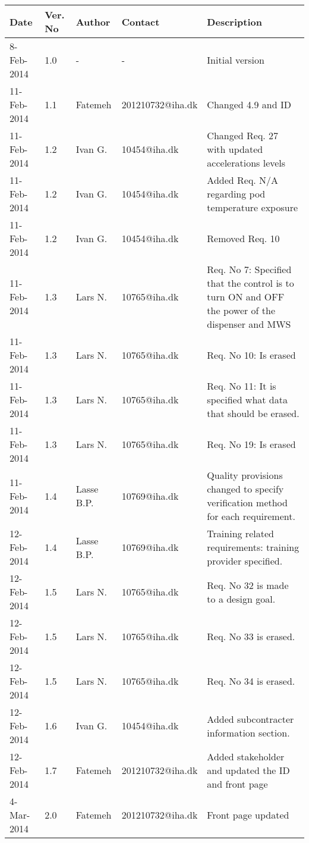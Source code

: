 \begin{center}
    \begin{tabular}{ | l | p{1cm} | l | l | p{5cm} |}
    \hline
    Date&Ver. No & Author &Contact &Description         									 \\ \hline
	8-Feb-2014&1.0 & - & - & Initial version                                         \\
	11-Feb-2014&1.1 & Fatemeh &201210732@iha.dk&Changed 4.9 and ID \\
	11-Feb-2014&1.2 & Ivan G.& 10454@iha.dk& Changed Req. 27 with updated accelerations levels\\
	11-Feb-2014&1.2 & Ivan G.& 10454@iha.dk& Added Req. N/A regarding pod temperature exposure\\
	11-Feb-2014&1.2 & Ivan G.& 10454@iha.dk& Removed Req. 10\\
	11-Feb-2014&1.3 & Lars N.& 10765@iha.dk& Req. No 7: Specified that the control is to turn ON and OFF the power of the dispenser and MWS \\
	11-Feb-2014&1.3 & Lars N.& 10765@iha.dk& Req. No 10: Is erased\\
	11-Feb-2014&1.3 & Lars N.& 10765@iha.dk& Req. No 11: It is specified what data that should be erased. \\
    11-Feb-2014&1.3 & Lars N.& 10765@iha.dk& Req. No 19: Is erased\\
    11-Feb-2014&1.4 & Lasse B.P.& 10769@iha.dk& Quality provisions changed to specify verification method for each requirement. \\
    12-Feb-2014&1.4 & Lasse B.P.& 10769@iha.dk& Training related requirements: training provider specified. \\
    12-Feb-2014&1.5 & Lars N.& 10765@iha.dk& Req. No 32 is made to a design goal. \\
    12-Feb-2014&1.5 & Lars N.& 10765@iha.dk& Req. No 33 is erased. \\
    12-Feb-2014&1.5 & Lars N.& 10765@iha.dk& Req. No 34 is erased. \\
    12-Feb-2014&1.6 & Ivan G.& 10454@iha.dk& Added subcontracter information section.\\
	12-Feb-2014&1.7 & Fatemeh & 201210732@iha.dk& Added stakeholder and updated the ID and front page\\
	4-Mar-2014&2.0 & Fatemeh & 201210732@iha.dk & Front page updated\\
    \hline
    \end{tabular}
\end{center} 